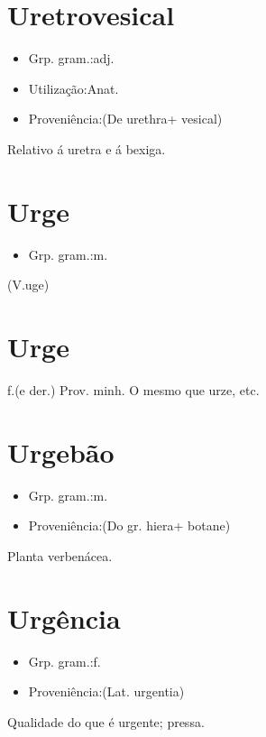 \documentclass{article}
\begin{document}
\section{Uretrovesical}
\begin{itemize}
\item {Grp. gram.:adj.}
\end{itemize}
\begin{itemize}
\item {Utilização:Anat.}
\end{itemize}
\begin{itemize}
\item {Proveniência:(De \textunderscore urethra\textunderscore  + \textunderscore vesical\textunderscore )}
\end{itemize}
Relativo á uretra e á bexiga.
\section{Urge}
\begin{itemize}
\item {Grp. gram.:m.}
\end{itemize}
(V.uge)
\section{Urge}
\textunderscore f.\textunderscore  (e der.) \textunderscore Prov. minh.\textunderscore 
O mesmo que \textunderscore urze\textunderscore , etc.
\section{Urgebão}
\begin{itemize}
\item {Grp. gram.:m.}
\end{itemize}
\begin{itemize}
\item {Proveniência:(Do gr. \textunderscore hiera\textunderscore  + \textunderscore botane\textunderscore )}
\end{itemize}
Planta verbenácea.
\section{Urgência}
\begin{itemize}
\item {Grp. gram.:f.}
\end{itemize}
\begin{itemize}
\item {Proveniência:(Lat. \textunderscore urgentia\textunderscore )}
\end{itemize}
Qualidade do que é urgente; pressa.
\end{document}
